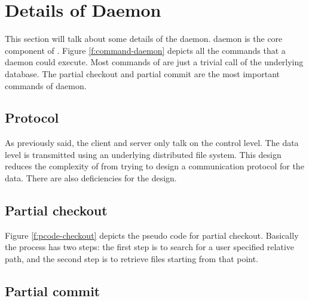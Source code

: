 \section{Details of \Sys Daemon}
\label{s:daemon}

This section will talk about some details of the \sys daemon. \Sys daemon is the
core component of \sys. Figure \ref{f:command-daemon} depicts all the commands
that a \sys daemon could execute. Most commands of \sys are just a trivial call
of the underlying \git database. The partial checkout and partial commit are the
most important commands of \sys daemon.

\subsection{Protocol}

As previously said,
the client and server only talk on the control level. The data level is
transmitted using an underlying distributed file system. This design reduces the
complexity of \sys from trying to design a communication protocol for the data.
There are also deficiencies for the design. 


\subsection{Partial checkout}



Figure \ref{f:pcode-checkout} depicts the pseudo code for partial checkout.
Basically the process has two steps: the first step is to search for a user
specified relative path, and the second step is to retrieve files starting from
that point. 

\subsection{Partial commit}


